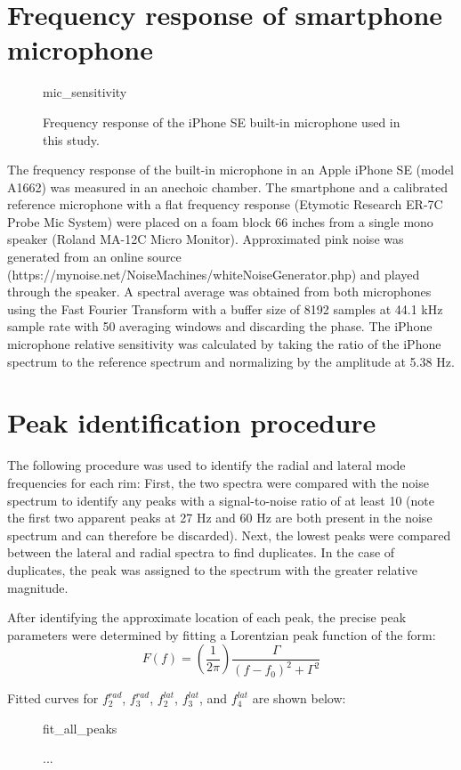 \documentclass[../../thesis.tex]{subfiles}
\begin{document}
\section{Frequency response of smartphone microphone}
\label{app:mic_cal}

\begin{figure}[h]
\centering
{mic_sensitivity}
\caption{Frequency response of the iPhone SE built-in microphone used in this study.}
\label{fig:mic_sensitivity}
\end{figure}

The frequency response of the built-in microphone in an Apple iPhone SE (model A1662) was measured in an anechoic chamber. The smartphone and a calibrated reference microphone with a flat frequency response (Etymotic Research ER-7C Probe Mic System) were placed on a foam block 66 inches from a single mono speaker (Roland MA-12C Micro Monitor). Approximated pink noise was generated from an online source (https://mynoise.net/NoiseMachines/whiteNoiseGenerator.php) and played through the speaker. A spectral average was obtained from both microphones using the Fast Fourier Transform with a buffer size of 8192 samples at 44.1 kHz sample rate with 50 averaging windows and discarding the phase. The iPhone microphone relative sensitivity was calculated by taking the ratio of the iPhone spectrum to the reference spectrum and normalizing by the amplitude at 5.38 Hz.

\section{Peak identification procedure}
\label{app:peak_fits}

The following procedure was used to identify the radial and lateral mode frequencies for each rim: First, the two spectra were compared with the noise spectrum to identify any peaks with a signal-to-noise ratio of at least 10 (note the first two apparent peaks at 27 Hz and 60 Hz are both present in the noise spectrum and can therefore be discarded). Next, the lowest peaks were compared between the lateral and radial spectra to find duplicates. In the case of duplicates, the peak was assigned to the spectrum with the greater relative magnitude.

After identifying the approximate location of each peak, the precise peak parameters were determined by fitting a Lorentzian peak function of the form:
\begin{equation}
\label{eq:ema_peak_fit}
F(f) = \left(\frac{1}{2\pi}\right) \frac{\Gamma}{(f-f_0)^2 + \Gamma^2}
\end{equation}

Fitted curves for $f_2^{rad}$, $f_3^{rad}$, $f_2^{lat}$, $f_3^{lat}$, and $f_4^{lat}$ are shown below:

\begin{figure}
\centering
{fit_all_peaks}
\caption{...}
\label{fig:ema_all_peaks}
\end{figure}
\end{document}
